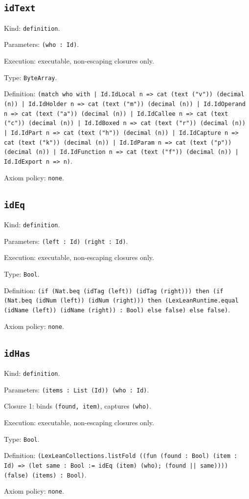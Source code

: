 \documentclass[11pt]{article}
\begin{document}
\subsection*{\texttt{idText}}
\noindent Kind: \texttt{definition}.\par
\noindent Parameters: \texttt{(who : Id)}.\par
\noindent Execution: executable, non-escaping closures only.\par
\noindent Type: \texttt{ByteArray}.\par
\noindent Definition: \texttt{(match who with | Id.IdLocal n => cat (text ("v")) (decimal (n)) | Id.IdHolder n => cat (text ("m")) (decimal (n)) | Id.IdOperand n => cat (text ("a")) (decimal (n)) | Id.IdCallee n => cat (text ("c")) (decimal (n)) | Id.IdBoxed n => cat (text ("r")) (decimal (n)) | Id.IdPart n => cat (text ("h")) (decimal (n)) | Id.IdCapture n => cat (text ("k")) (decimal (n)) | Id.IdParam n => cat (text ("p")) (decimal (n)) | Id.IdFunction n => cat (text ("f")) (decimal (n)) | Id.IdExport n => n)}.\par
\noindent Axiom policy: \texttt{none}.\par
\subsection*{\texttt{idEq}}
\noindent Kind: \texttt{definition}.\par
\noindent Parameters: \texttt{(left : Id) (right : Id)}.\par
\noindent Execution: executable, non-escaping closures only.\par
\noindent Type: \texttt{Bool}.\par
\noindent Definition: \texttt{(if (Nat.beq (idTag (left)) (idTag (right))) then (if (Nat.beq (idNum (left)) (idNum (right))) then (LexLeanRuntime.equal (idName (left)) (idName (right)) : Bool) else false) else false)}.\par
\noindent Axiom policy: \texttt{none}.\par
\subsection*{\texttt{idHas}}
\noindent Kind: \texttt{definition}.\par
\noindent Parameters: \texttt{(items : List (Id)) (who : Id)}.\par
\noindent Closure 1: binds \texttt{(found, item)}, captures \texttt{(who)}.\par
\noindent Execution: executable, non-escaping closures only.\par
\noindent Type: \texttt{Bool}.\par
\noindent Definition: \texttt{(LexLeanCollections.listFold ((fun (found : Bool) (item : Id) => (let same : Bool := idEq (item) (who); (found || same)))) (false) (items) : Bool)}.\par
\noindent Axiom policy: \texttt{none}.\par
\end{document}
